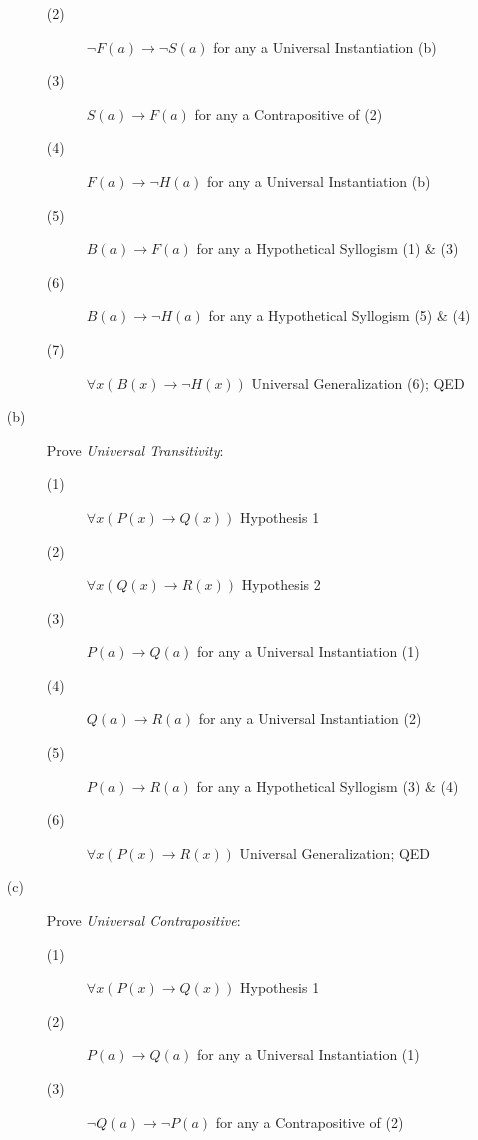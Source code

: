 \documentclass[12pt]{article}
\begin{document}
\begin{enumerate}
\begin{description}
\begin{description}
                    \item[(2)] $\neg F(a) \to \neg S(a)$ for any a \null\hfill Universal Instantiation (b)
                    \item[(3)] $S(a) \to F(a)$ for any a \null\hfill Contrapositive of (2)
                    \item[(4)] $F(a) \to \neg H(a)$ for any a \null\hfill Universal Instantiation (b)
                    \item[(5)] $B(a) \to F(a)$ for any a \null\hfill Hypothetical Syllogism (1) \& (3)
                    \item[(6)] $B(a) \to \neg H(a)$ for any a \null\hfill Hypothetical Syllogism (5) \& (4)
                    \item[(7)] $\forall x(B(x) \to \neg H(x))$ \null\hfill Universal Generalization (6); QED
                \end{description}
                \item[(b)] Prove \emph{Universal Transitivity}:
                    \begin{description}
                        \item[(1)] $\forall x(P(x) \to Q(x))$ \null\hfill Hypothesis 1
                        \item[(2)] $\forall x(Q(x) \to R(x))$ \null\hfill Hypothesis 2
                        \item[(3)] $P(a) \to Q(a)$ for any a \null\hfill Universal Instantiation (1)
                        \item[(4)] $Q(a) \to R(a)$ for any a \null\hfill Universal Instantiation (2)
                        \item[(5)] $P(a) \to R(a)$ for any a \null\hfill Hypothetical Syllogism (3) \& (4)
                        \item[(6)] $\forall x(P(x) \to R(x))$ \null\hfill Universal Generalization; QED
                    \end{description}
                \item[(c)] Prove \emph{Universal Contrapositive}:
                    \begin{description}
                        \item[(1)] $\forall x(P(x) \to Q(x))$ \null\hfill Hypothesis 1
                        \item[(2)] $P(a) \to Q(a)$ for any a \null\hfill Universal Instantiation (1)
                        \item[(3)] $\neg Q(a) \to \neg P(a)$ for any a \null\hfill Contrapositive of (2)

\end{description}
\end{description}
\end{enumerate}
\end{document}
